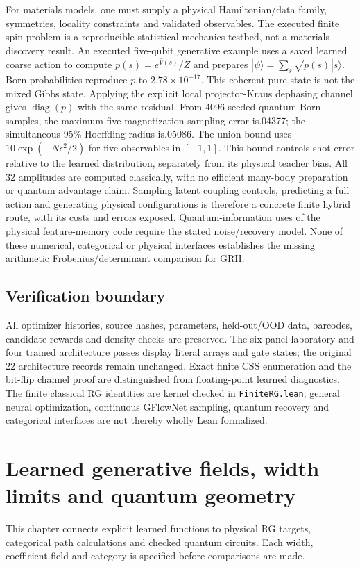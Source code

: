 \documentclass[11pt,oneside,openany]{book}
\theoremstyle{definition}\newtheorem{definition}[theorem]{Definition}
\theoremstyle{remark}\newtheorem{remark}[theorem]{Remark}
\begin{document}
For materials models, one must supply a physical Hamiltonian/data family,
symmetries, locality constraints and validated observables. The executed
finite spin problem is a reproducible statistical-mechanics testbed, not a
materials-discovery result. An executed five-qubit generative example uses a saved learned coarse
action to compute $ p(s)=e^{\widehat V(s)}/Z $ and prepares
$|\psi\rangle=\sum_s\sqrt{p(s)}|s\rangle $. Born probabilities reproduce
$ p $ to $2.78\times 10^{-17}$. This coherent pure state is not the mixed Gibbs
state. Applying the explicit local projector-Kraus dephasing channel gives
$\operatorname{diag}(p)$ with the same residual. From 4096 seeded quantum
Born samples, the maximum five-magnetization sampling error is.04377; the
simultaneous 95\% Hoeffding radius is.05086. The union bound uses
$10\exp(-N\epsilon^2/2)$ for five observables in $[-1,1]$. This bound controls
shot error relative to the learned distribution, separately from its physical
teacher bias. All 32 amplitudes are computed classically, with no efficient
many-body preparation or quantum advantage claim. Sampling latent coupling
controls, predicting a full action and generating physical configurations is
therefore a concrete finite hybrid route, with its costs and errors exposed. Quantum-information uses of the physical feature-memory
code require the stated noise/recovery model. None of these numerical,
categorical or physical interfaces establishes the missing arithmetic
Frobenius/determinant comparison for GRH.

\section{Verification boundary}
All optimizer histories, source hashes, parameters, held-out/OOD data,
barcodes, candidate rewards and density checks are preserved. The six-panel
laboratory and four trained architecture passes display literal arrays and
gate states; the original 22 architecture records remain unchanged. Exact
finite CSS enumeration and the bit-flip channel proof are distinguished
from floating-point learned diagnostics. The finite classical RG identities
are kernel checked in \texttt{FiniteRG.lean}; general neural optimization,
continuous GFlowNet sampling, quantum recovery and categorical interfaces
are not thereby wholly Lean formalized.

\chapter{Learned generative fields, width limits and quantum geometry}
\label{book:learned-frontier}
This chapter connects explicit learned functions to physical RG targets, categorical path calculations and checked quantum circuits. Each width, coefficient field and category is specified before comparisons are made.
\end{document}
